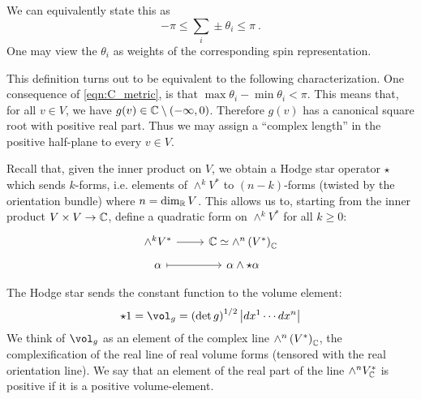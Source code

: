 \begin{rmk}
We can equivalently state this as
\begin{equation*}
-\pi \leq \sum_i \pm \theta_i \leq \pi \ .
\end{equation*}
One may view the $\theta_i$ as weights of the corresponding spin representation.
\end{rmk}


This definition turns out to be equivalent to the following characterization. 
One consequence of \eqref{eqn:C_metric}, is that $\max \theta_i - \min \theta_i < \pi$. 
This means that, for all $v \in V$,
we have $g(v) \in \mathbb{C} \setminus (-\infty, 0)$.
Therefore $g(v)$ has a canonical square root with positive real part. 
Thus we may assign a ``complex length'' in the positive half-plane to every $v \in V$.

Recall that, given the inner product on $V$, we obtain a Hodge star operator $\star$ which
sends $k$-forms, i.e. elements of $\wedge^k V^*$ to $\left(n-k\right)$-forms
(twisted by the orientation bundle)
where $n = \dim_{\mathbb{R}} V$.
This allows us to, starting from the inner product $V \times V \to \mathbb{C}$, define a
quadratic form on $\wedge^k V^*$ for all $k \geq 0$:
\begin{equation*}
\begin{tikzcd}[row sep=tiny]
\wedge^k V^* \ar{r}&
\CC \simeq 
\wedge^n\left(V^*\right)_\CC 
\\
\alpha \ar[mapsto]{r}&
\alpha \wedge \star \alpha
\end{tikzcd}
\end{equation*}

The Hodge star sends the constant function to the volume element:
\begin{equation*}
\star 1 = \vol_g = \left(\det g\right)^{1/2} \abs{ dx^1 \cdots dx^n }
\end{equation*}
We think of $\vol_g$ as an element of the complex line 
$\wedge^n \left(V^*\right)_{\mathbb{C}}$, the complexification of the real line of real volume
forms (tensored with the real orientation line).
We say that an element of the real part of the line $\wedge^nV^*_{\mathbb{C}}$
is positive if it is a positive volume-element. 

